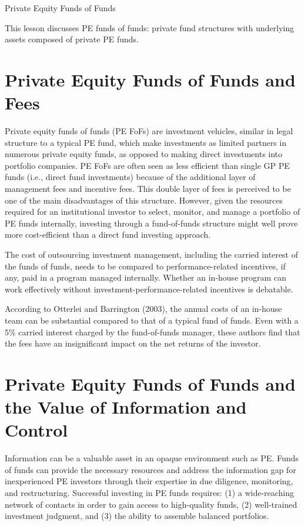 \documentclass[11pt]{article}
\begin{document}
Private Equity Funds of Funds

This lesson discusses PE funds of funds: private fund structures with underlying assets composed of private PE funds.

\section*{Private Equity Funds of Funds and Fees}
Private equity funds of funds (PE FoFs) are investment vehicles, similar in legal structure to a typical PE fund, which make investments as limited partners in numerous private equity funds, as opposed to making direct investments into portfolio companies. PE FoFs are often seen as less efficient than single GP PE funds (i.e., direct fund investments) because of the additional layer of management fees and incentive fees. This double layer of fees is perceived to be one of the main disadvantages of this structure. However, given the resources required for an institutional investor to select, monitor, and manage a portfolio of PE funds internally, investing through a fund-of-funds structure might well prove more cost-efficient than a direct fund investing approach.

The cost of outsourcing investment management, including the carried interest of the funds of funds, needs to be compared to performance-related incentives, if any, paid in a program managed internally. Whether an in-house program can work effectively without investment-performance-related incentives is debatable.

According to Otterlei and Barrington (2003), the annual costs of an in-house team can be substantial compared to that of a typical fund of funds. Even with a 5\% carried interest charged by the fund-of-funds manager, these authors find that the fees have an insignificant impact on the net returns of the investor.

\section*{Private Equity Funds of Funds and the Value of Information and Control}
Information can be a valuable asset in an opaque environment such as PE. Funds of funds can provide the necessary resources and address the information gap for inexperienced PE investors through their expertise in due diligence, monitoring, and restructuring. Successful investing in PE funds requires: (1) a wide-reaching network of contacts in order to gain access to high-quality funds, (2) well-trained investment judgment, and (3) the ability to assemble balanced portfolios.
\end{document}
